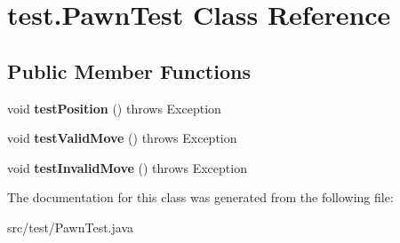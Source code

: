 \hypertarget{classtest_1_1_pawn_test}{}\section{test.\+Pawn\+Test Class Reference}
\label{classtest_1_1_pawn_test}
\subsection*{Public Member Functions}
\begin{DoxyCompactItemize}
\item 
\mbox{\label{classtest_1_1_pawn_test_a843453c706973021b99499f44c891e6a}} 
void {\bfseries test\+Position} ()  throws Exception 
\item 
\mbox{\label{classtest_1_1_pawn_test_ab015d6288131fcc3be0db85c96bf926e}} 
void {\bfseries test\+Valid\+Move} ()  throws Exception 
\item 
\mbox{\label{classtest_1_1_pawn_test_a8d47ac0e26d59ad405fdc834a16bd220}} 
void {\bfseries test\+Invalid\+Move} ()  throws Exception 
\end{DoxyCompactItemize}


The documentation for this class was generated from the following file\+:\begin{DoxyCompactItemize}
\item 
src/test/Pawn\+Test.\+java\end{DoxyCompactItemize}
